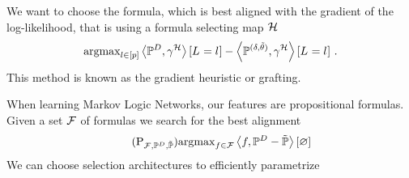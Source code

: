 We want to choose the formula, which is best aligned with the gradient of the log-likelihood, that is using a formula selecting map $\mathcal{H}$
\begin{align*}
	\mathrm{argmax}_{l\in[p]} \left\langle \mathbb{P}^{D},\gamma^{\mathcal{H}}\right\rangle \left[ L_{}=l_{} \right] - \left\langle \mathbb{P}^{(\delta, \tilde{\theta})},\gamma^{\mathcal{H}}\right\rangle \left[ L_{}=l_{} \right] \, . 
\end{align*}
This method is known as the gradient heuristic or grafting.






When learning Markov Logic Networks, our features are propositional formulas.
Given a set $\mathcal{F}$ of formulas we search for the best alignment 
\begin{align}\label{prob:steepestAscent}\tag{$\mathrm{P}_{\formulaset,\empdistribution,\currentdistribution}$}
	\argmax_{\formula\in\formulaset} \sbcontraction{\formula,\empdistribution-\currentdistribution}
\end{align}
We can choose selection architectures to efficiently parametrize 




